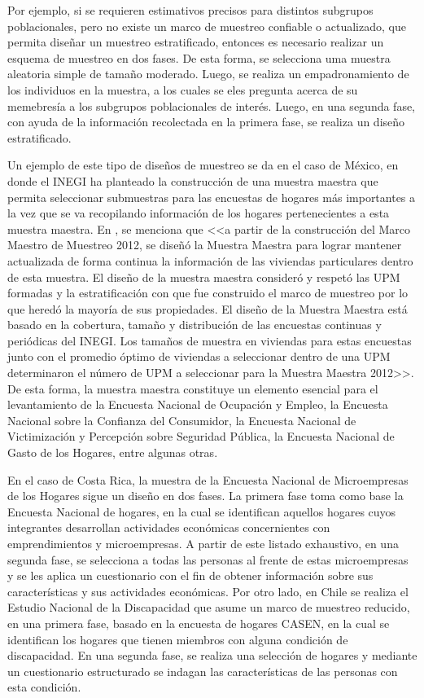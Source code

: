 \documentclass[
  10pt,
  spanish,
]{book}
\begin{document}
Por ejemplo, si se requieren estimativos precisos para distintos subgrupos poblacionales, pero no existe un marco de muestreo confiable o actualizado, que permita diseñar un muestreo estratificado, entonces es necesario realizar un esquema de muestreo en dos fases. De esta forma, se selecciona uma muestra aleatoria simple de tamaño moderado. Luego, se realiza un empadronamiento de los individuos en la muestra, a los cuales se eles pregunta acerca de su memebresía a los subgrupos poblacionales de interés. Luego, en una segunda fase, con ayuda de la información recolectada en la primera fase, se realiza un diseño estratificado.

Un ejemplo de este tipo de diseños de muestreo se da en el caso de México, en donde el INEGI ha planteado la construcción de una muestra maestra que permita seleccionar submuestras para las encuestas de hogares más importantes a la vez que se va recopilando información de los hogares pertenecientes a esta muestra maestra. En \citet{INEGI_MX_2012}, se menciona que \textless\textless a partir de la construcción del Marco Maestro de Muestreo 2012, se diseñó la Muestra Maestra para lograr mantener actualizada de forma continua la información de las viviendas particulares dentro de esta muestra. El diseño de la muestra maestra consideró y respetó las UPM formadas y la estratificación con que fue construido el marco de muestreo por lo que heredó la mayoría de sus propiedades. El diseño de la Muestra Maestra está basado en la cobertura, tamaño y distribución de las encuestas continuas y periódicas del INEGI. Los tamaños de muestra en viviendas para estas encuestas junto con el promedio óptimo de viviendas a seleccionar dentro de una UPM determinaron el número de UPM a seleccionar para la Muestra Maestra 2012\textgreater\textgreater. De esta forma, la muestra maestra constituye un elemento esencial para el levantamiento de la Encuesta Nacional de Ocupación y Empleo, la Encuesta Nacional sobre la Confianza del Consumidor, la Encuesta Nacional de Victimización y Percepción sobre Seguridad Pública, la Encuesta Nacional de Gasto de los Hogares, entre algunas otras.

En el caso de Costa Rica, la muestra de la Encuesta Nacional de Microempresas de los Hogares sigue un diseño en dos fases. La primera fase toma como base la Encuesta Nacional de hogares, en la cual se identifican aquellos hogares cuyos integrantes desarrollan actividades económicas concernientes con emprendimientos y microempresas. A partir de este listado exhaustivo, en una segunda fase, se selecciona a todas las personas al frente de estas microempresas y se les aplica un cuestionario con el fin de obtener información sobre sus características y sus actividades económicas. Por otro lado, en Chile se realiza el Estudio Nacional de la Discapacidad que asume un marco de muestreo reducido, en una primera fase, basado en la encuesta de hogares CASEN, en la cual se identifican los hogares que tienen miembros con alguna condición de discapacidad. En una segunda fase, se realiza una selección de hogares y mediante un cuestionario estructurado se indagan las características de las personas con esta condición.
\end{document}
